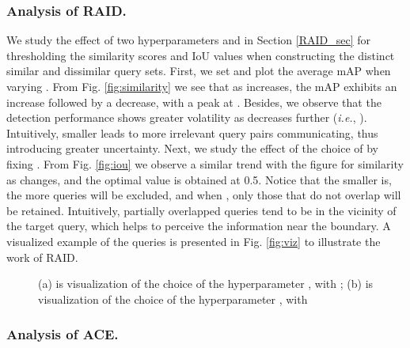\documentclass[runningheads]{llncs}
\def\ie{{\em i.e.}}
\newcommand{\figref}[1]{Fig. \ref{#1}}
\newcommand{\secref}[1]{Section \ref{#1}}
\begin{document}
\subsubsection{Analysis of RAID.} We study the effect of two hyperparameters  and  in \secref{RAID_sec} for thresholding the similarity scores and IoU values when constructing the distinct similar and dissimilar query sets. First, we set  and plot the average mAP when varying . From \figref{fig:similarity} we see that as  increases, the mAP exhibits an increase followed by a decrease, with a peak at . Besides, we observe that the detection performance shows greater volatility as  decreases further (\ie, ). Intuitively, smaller  leads to more irrelevant query pairs communicating, thus introducing greater uncertainty. Next, we study the effect of the choice of  by fixing . From \figref{fig:iou} we observe a similar trend with the figure for similarity as  changes, and the optimal value is obtained at 0.5. Notice that the smaller  is, the more queries will be excluded, and when , only those that do not overlap will be retained. Intuitively, partially overlapped queries tend to be in the vicinity of the target query, which helps to perceive the information near the boundary. A visualized example of the queries is presented in \figref{fig:viz} to illustrate the work of RAID.

\begin{figure}[t]
    \centering
    \setlength{\abovecaptionskip}{-0.005cm}
    \quad
   
  \caption{(a) is visualization of the choice of the hyperparameter , with ; (b) is visualization of the choice of the hyperparameter , with  }
  \vspace{-0.3cm}
\end{figure}





\subsubsection{Analysis of ACE.}
\end{document}
